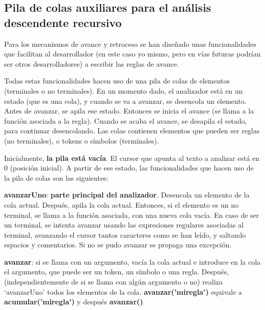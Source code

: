 \documentclass{report}
\begin{document}
	\subsection{Pila de colas auxiliares para el análisis descendente recursivo}
	
	Para los mecanismos de avance y retroceso se han diseñado unas funcionalidades que facilitan al desarrollador (en este caso yo mismo, pero en vías futuras podrían ser otros desarrolladores) a escribir las reglas de avance. 
	
	\vspace{10px}
	
	Todas estas funcionalidades hacen uso de una pila de colas de elementos (terminales o no terminales). En un momento dado, el analizador está en un estado (que es una cola), y cuando se va a avanzar, se desencola un elemento. Antes de avanzar, se apila ese estado. Entonces se inicia el avance (se llama a la función asociada a la regla). Cuando se acaba el avance, se desapila el estado, para continuar desencolando. Las colas contienen elementos que pueden ser reglas (no terminales), o tokens o símbolos (terminales).
	
	\vspace{10px}
	
	Inicialmente, \textbf{la pila está vacía}. El cursor que apunta al texto a analizar está en 0 (posición inicial). A partir de ese estado, las funcionalidades que hacen uso de la pila de colas son las siguientes:
	
	\vspace{10px}
	\noindent
	\textbf{avanzarUno}: \textbf{parte principal del analizador}. Desencola un elemento de la cola actual. Después, apila la cola actual. Entonces, si el elemento es un no terminal, se llama a la función asociada, con una nueva cola vacía. En caso de ser un terminal, se intenta avanzar usando las expresiones regulares asociadas al terminal, avanzando el cursor tantos caracteres como se han leído, y saltando espacios y comentarios. Si no se pudo avanzar se propaga una excepción.
	
	\vspace{10px}
	\noindent
	\textbf{avanzar}: si se llama con un argumento, vacía la cola actual e introduce en la cola el argumento, que puede ser un token, un símbolo o una regla. Después, (independientemente de si se llama con algún argumento o no) realiza `avanzarUno' todos los elementos de la cola.  \textbf{avanzar('miregla')} equivale a \textbf{acumular('miregla')} y después \textbf{avanzar()}.
	
\end{document}
